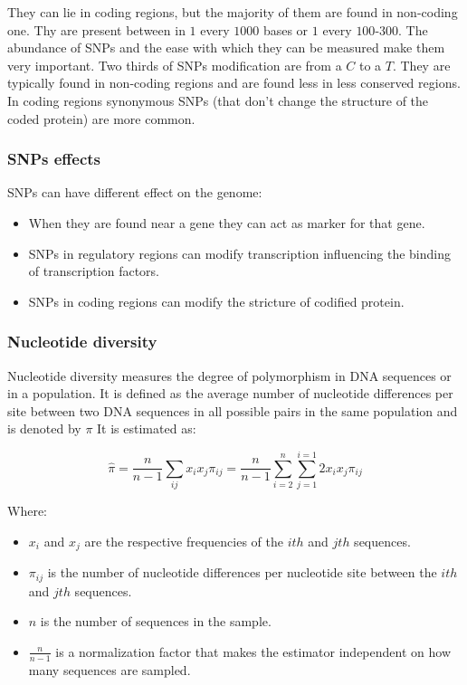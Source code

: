		They can lie in coding regions, but the majority of them are found in non-coding one.
		Thy are present between in $1$ every $1000$ bases or $1$ every $100$-$300$.
		The abundance of SNPs and the ease with which they can be measured make them very important.
		Two thirds of SNPs modification are from a $C$ to a $T$.
		They are typically found in non-coding regions and are found less in less conserved regions.
		In coding regions synonymous SNPs (that don't change the structure of the coded protein) are more common.

		\subsubsection{SNPs effects}
		SNPs can have different effect on the genome:

		\begin{multicols}{2}
			\begin{itemize}
				\item When they are found near a gene they can act as marker for that gene.
				\item SNPs in regulatory regions can modify transcription influencing the binding of transcription factors.
				\item SNPs in coding regions can modify the stricture of codified protein.
			\end{itemize}
		\end{multicols}

		\subsubsection{Nucleotide diversity}
		Nucleotide diversity measures the degree of polymorphism in DNA sequences or in a population.
		It is defined as the average number of nucleotide differences per site between two DNA sequences in all possible pairs in the same population and is denoted by $\pi$
		It is estimated as:

		$$\hat{\pi} = \frac{n}{n-1}\sum\limits_{ij} x_ix_j\pi_{ij} = \frac{n}{n-1} \sum\limits_{i=2}^n\sum\limits_{j=1}^{i=1}2x_ix_j\pi_{ij}$$

		Where:

		\begin{multicols}{2}
			\begin{itemize}
				\item $x_i$ and $x_j$ are the respective frequencies of the $ith$ and $jth$ sequences.
				\item	$\pi_{ij}$ is the number of nucleotide differences per nucleotide site between the $ith$ and $jth$ sequences.
				\item $n$ is the number of sequences in the sample.
				\item $\frac{n}{n-1}$ is a normalization factor that makes the estimator independent on how many sequences are sampled.
			\end{itemize}
		\end{multicols}

